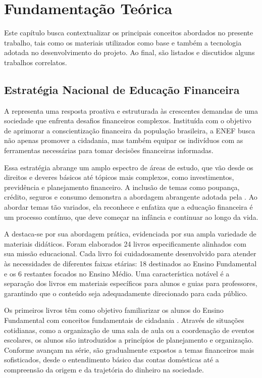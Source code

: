 \chapter{Fundamentação Teórica}
Este capítulo busca contextualizar os principais conceitos abordados no presente trabalho, tais como os materiais utilizados como base e também a tecnologia adotada no desenvolvimento do projeto. Ao final, são listados e discutidos alguns trabalhos correlatos.

\section{Estratégia Nacional de Educação Financeira}

A \cite{ENEF} representa uma resposta proativa e estruturada às crescentes demandas de uma sociedade que enfrenta desafios financeiros complexos. Instituída com o objetivo de aprimorar a conscientização financeira da população brasileira, a ENEF busca não apenas promover a cidadania, mas também equipar os indivíduos com as ferramentas necessárias para tomar decisões financeiras informadas.

Essa estratégia abrange um amplo espectro de áreas de estudo, que vão desde os direitos e deveres básicos até tópicos mais complexos, como investimentos, previdência e planejamento financeiro. A inclusão de temas como poupança, crédito, seguros e consumo demonstra a abordagem abrangente adotada pela \cite{ENEF}. Ao abordar temas tão variados, ela reconhece e enfatiza que a educação financeira é um processo contínuo, que deve começar na infância e continuar ao longo da vida.

A \cite{ENEF} destaca-se por sua abordagem prática, evidenciada por sua ampla variedade de materiais didáticos. Foram elaborados 24 livros especificamente alinhados com sua missão educacional. Cada livro foi cuidadosamente desenvolvido para atender às necessidades de diferentes faixas etárias: 18 destinados ao Ensino Fundamental e os 6 restantes focados no Ensino Médio. Uma característica notável é a separação dos livros em materiais específicos para alunos e guias para professores, garantindo que o conteúdo seja adequadamente direcionado para cada público.

Os primeiros livros têm como objetivo familiarizar os alunos do Ensino Fundamental com conceitos fundamentais de cidadania \cite{ENEF_EF}. Através de situações cotidianas, como a organização de uma sala de aula ou a coordenação de eventos escolares, os alunos são introduzidos a princípios de planejamento e organização. Conforme avançam na série, são gradualmente expostos a temas financeiros mais sofisticados, desde o entendimento básico das contas domésticas até a compreensão da origem e da trajetória do dinheiro na sociedade.

